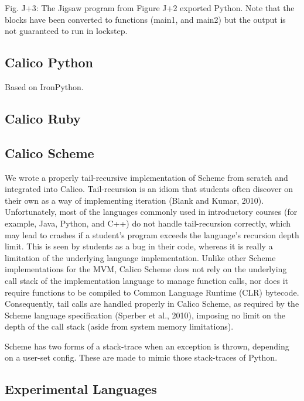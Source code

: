 \documentclass[preprint]{sigplanconf}
\begin{document}
Fig. J+3: The Jigsaw program from Figure J+2 exported Python. Note that the blocks have been converted to functions (main1, and main2) but the output is not guaranteed to run in lockstep.


\subsection{Calico Python}


Based on IronPython. 


\subsection{Calico Ruby}


\subsection{Calico Scheme}


We wrote a properly tail-recursive implementation of Scheme from scratch and integrated into Calico.  Tail-recursion is an idiom that students often discover on their own as a way of implementing iteration (Blank and Kumar, 2010). Unfortunately, most of the languages commonly used in introductory courses (for example, Java, Python, and C++) do not handle tail-recursion correctly, which may lead to crashes if a student’s program exceeds the language’s recursion depth limit. This is seen by students as a bug in their code, whereas it is really a limitation of the underlying language implementation. Unlike other Scheme implementations for the MVM, Calico Scheme does not rely on the underlying call stack of the implementation language to manage function calls, nor does it require functions to be compiled to Common Language Runtime (CLR) bytecode. Consequently, tail calls are handled properly in Calico Scheme, as required by the Scheme language specification (Sperber et al., 2010), imposing no limit on the depth of the call stack (aside from system memory limitations).


Scheme has two forms of a stack-trace when an exception is thrown, depending on a user-set config. These are made to mimic those stack-traces of Python.


\subsection{Experimental Languages}
\end{document}
